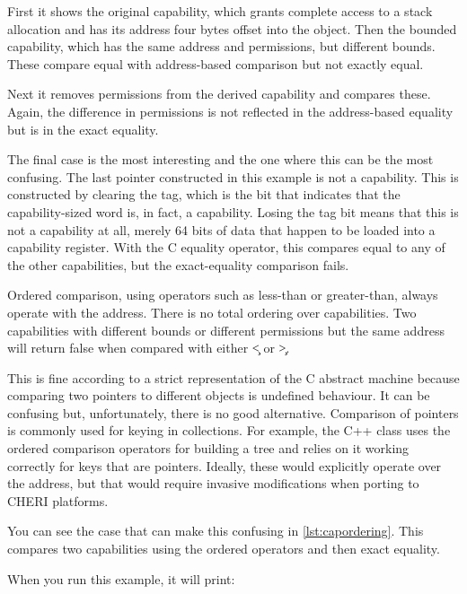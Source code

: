 {{{{{{{{First it shows the original capability, which grants complete access to a stack allocation and has its address four bytes offset into the object.
Then the bounded capability, which has the same address and permissions, but different bounds.
These compare equal with address-based comparison but not exactly equal.

Next it removes permissions from the derived capability and compares these.
Again, the difference in permissions is not reflected in the address-based equality but is in the exact equality.

The final case is the most interesting and the one where this can be the most confusing.
The last pointer constructed in this example is not a capability.
This is constructed by clearing the tag, which is the bit that indicates that the capability-sized word is, in fact, a capability.
Losing the tag bit means that this is not a capability at all, merely 64 bits of data that happen to be loaded into a capability register.
With the C equality operator, this  compares equal to any of the other capabilities, but the exact-equality comparison fails.

Ordered comparison, using operators such as less-than or greater-than, always operate with the address.
There is no total ordering over capabilities.
Two capabilities with different bounds or different permissions but the same address will return false when compared with either \c{<} or \c{>}.

This is fine according to a strict representation of the C abstract machine because comparing two pointers to different objects is undefined behaviour.
It can be confusing but, unfortunately, there is no good alternative.
Comparison of pointers is commonly used for keying in collections.
For example, the C++  class uses the ordered comparison operators for building a tree and relies on it working correctly for keys that are pointers.
Ideally, these would explicitly operate over the address, but that would require invasive modifications when porting to CHERI platforms.

You can see the case that can make this confusing in \ref{lst:capordering}.
This compares two capabilities using the ordered operators and then exact equality.

\codelisting[filename=examples/compare_capabilities/example.c,marker=capability_ordering,label=lst:capordering,caption="Trying to construct an ordering over two capabilities."]{}

When you run this example, it will print:

}}}}}}}}
